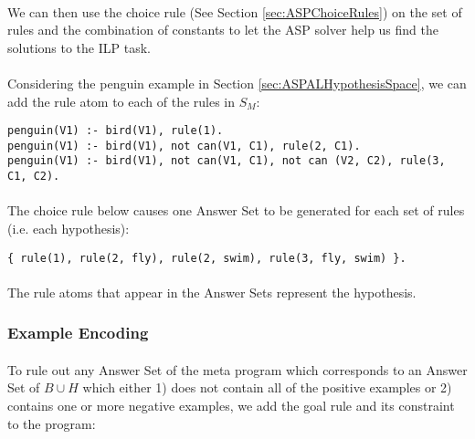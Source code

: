 \documentclass{article}
\theoremstyle{plain}
\theoremstyle{definition}
\begin{document}
\begin{multicols}{2}
\paragraph{} We can then use the choice rule (See Section \ref{sec:ASPChoiceRules}) on the set of rules and the combination of constants to let the ASP solver help us find the solutions to the ILP task.

\paragraph{} Considering the penguin example in Section \ref{sec:ASPALHypothesisSpace}, we can add the rule atom to each of the rules in $S_M$:

\begin{lstlisting}
penguin(V1) :- bird(V1), rule(1).
penguin(V1) :- bird(V1), not can(V1, C1), rule(2, C1).
penguin(V1) :- bird(V1), not can(V1, C1), not can (V2, C2), rule(3, C1, C2).
\end{lstlisting}

\paragraph{} The choice rule below causes one Answer Set to be generated for each set of rules (i.e. each hypothesis):

\begin{lstlisting}
{ rule(1), rule(2, fly), rule(2, swim), rule(3, fly, swim) }.
\end{lstlisting}

\paragraph{} The rule atoms that appear in the Answer Sets represent the hypothesis. 

\subsubsection{Example Encoding}

\paragraph{} To rule out any Answer Set of the meta program which corresponds to an Answer Set of $B \cup H$ which either 1) does not contain all of the positive examples or 2) contains one or more negative examples, we add the goal rule and its constraint to the program:


\end{multicols}
\end{document}
